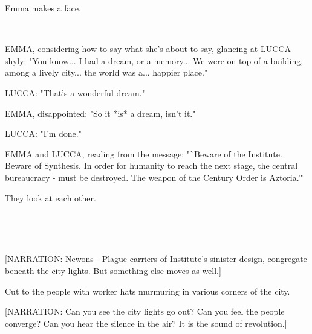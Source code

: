 \documentclass[11pt]{article}
\begin{document}
Emma makes a face.

\ 

EMMA, considering how to say what she's about to say, glancing at LUCCA shyly: "You know...
I had a dream, or a memory...
We were on top of a building, among a lively city...
the world was a... happier place."

LUCCA: "That's a wonderful dream."

EMMA, disappointed: "So it *is* a dream, isn't it."

LUCCA: "I'm done."

EMMA and LUCCA, reading from the message: "`Beware of the Institute. 
Beware of Synthesis.
In order for humanity to reach the next stage, the central bureaucracy - must be destroyed.
The weapon of the Century Order is Aztoria.'"

They look at each other.

\ 

\ 

[NARRATION: Newons - Plague carriers of Institute's sinister design, congregate beneath the city lights. 
But something else moves as well.]

Cut to the people with worker hats murmuring in various corners of the city.

[NARRATION: Can you see the city lights go out?
Can you feel the people converge?
Can you hear the silence in the air?
It is the sound of revolution.]
\end{document}

